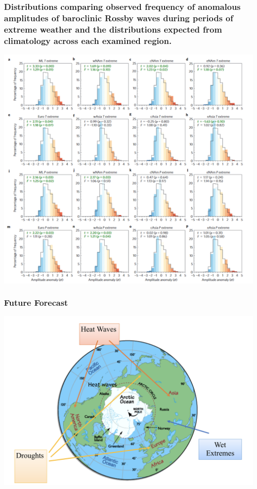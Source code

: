 \documentclass{beamer}
\begin{document}
\begin{frame}
\frametitle{Distributions comparing observed frequency of anomalous amplitudes of baroclinic Rossby waves during periods of extreme weather and the distributions expected from climatology across each examined region.}
\centering\includegraphics[scale=0.3]{Cathie7}
\end{frame}
\begin{frame}
\frametitle{Future Forecast}
\centering
\includegraphics[scale=0.3]{Cathie8}

\end{frame}
\end{document}
